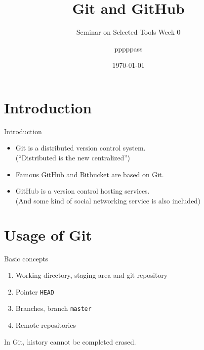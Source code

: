 \documentclass[english, nochinese]{pkuslide}
\title{Git and GitHub}
\subtitle{Seminar on Selected Tools Week 0}
\author{pppppass}
\date{\today}
\begin{document}
\begin{frame}
\titlepage
\end{frame}

\begin{frame}
\tableofcontents[subsectionstyle=show]
\end{frame}

\section{Introduction}

\begin{frame}
\sectionpage
\end{frame}

\begin{frame}{Introduction}
\begin{itemize}
\item Git is a distributed version control system. \\
(``Distributed is the new centralized'')
\item Famous GitHub and Bitbucket are based on Git.
\item GitHub is a version control hosting services. \\
(And some kind of social networking service is also included)
\end{itemize}
\end{frame}

\section{Usage of Git}

\begin{frame}
\sectionpage
\end{frame}

\begin{frame}[fragile]{Basic concepts}
\begin{enumerate}
\item Working directory, staging area and git repository
\item Pointer \verb"HEAD"
\item Branches, branch \verb"master"
\item Remote repositories
\end{enumerate}
In Git, history \alert{cannot} be completed erased.
\end{frame}
\end{document}
